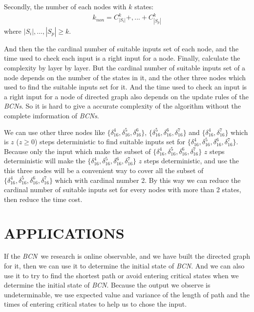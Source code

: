 \documentclass[conference]{IEEEtran} %
\def \BCN {{\em BCN}}
\begin{document}
Secondly, the number of each nodes with $k$ states:
\begin{equation}
\begin{split}
k_{non}= C_{|S_i|}^k+,...+C_{|S_p|}^k
\end{split}
\end{equation}
where $|S_i|,...,|S_p|\ge k$.

And then the the cardinal number of suitable inputs set of each node, and the time used to check each input is a right input for a node. Finally, calculate the complexity by layer by layer. But the cardinal number of suitable inputs set of a node depends on the number of the states in it, and the other three nodes which used to find the suitable inputs set for it. And the time used to check an input is a right input for  a node of directed graph also depends on the update rules of the {\em BCNs}. So it is hard to give a accurate complexity of the algorithm without the complete imformation of {\em BCNs}.

We can use other three nodes like $\{\delta_{16}^4,\delta_{16}^5,\delta_{16}^6\}$, $\{\delta_{16}^5,\delta_{16}^6,\delta_{16}^7\}$ and $\{\delta_{16}^4,\delta_{16}^7\}$ which is $z$ ($z\ge0$) steps deterministic to find suitable inputs set for $\{\delta_{16}^4,\delta_{16}^5,\delta_{16}^6,\delta_{16}^7\}$. Because only the input which make the subset of $\{\delta_{16}^4,\delta_{16}^5,\delta_{16}^6,\delta_{16}^7\}$ $z$ steps deterministic will make the $\{\delta_{16}^4,\delta_{16}^5,\delta_{16}^6,\delta_{16}^7\}$ $z$ steps deterministic, and use the this three nodes will be a convenient way to cover all the subset of $\{\delta_{16}^4,\delta_{16}^5,\delta_{16}^6,\delta_{16}^7\}$ which with cardinal number 2. By this way we can  reduce the cardinal number of suitable inputs set for every nodes with more than 2 states, then reduce the time cost. 



\section{APPLICATIONS}

If the \BCN\ we research is online observable, and we have built the directed graph for it, then we can use  it to determine the initial state of {\em BCN}. And we can also use it to try to find the shortest path or avoid entering critical states when we determine the initial state of {\em BCN}. Because the output we observe is undeterminable, we use expected value and variance of the length of path and the times of entering critical states to help us to chose the input.
\end{document}
